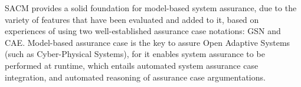SACM provides a solid foundation for model-based system assurance, due to the variety of features that have been evaluated and added to it, based on experiences of using two well-established assurance case notations: GSN and CAE.  Model-based assurance case is the key to assure Open Adaptive Systems (such as Cyber-Physical Systems), for it enables system assurance to be performed at runtime, which entails automated system assurance case integration, and automated reasoning of assurance case argumentations.


